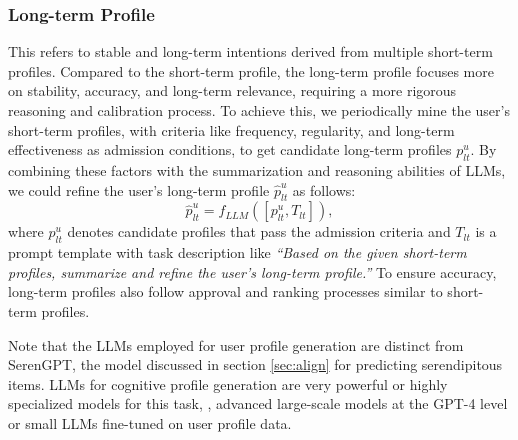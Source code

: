 
\subsubsection{Long-term Profile}\label{sec:long-term} This refers to stable and long-term intentions derived from multiple short-term profiles. Compared to the short-term profile, the long-term profile focuses more on stability, accuracy, and long-term relevance, requiring a more rigorous reasoning and calibration process. To achieve this, we periodically mine the user's short-term profiles, with criteria like frequency, regularity, and long-term effectiveness as admission conditions, to get candidate long-term profiles $p^u_{lt}$. By combining these factors with the summarization and reasoning abilities of LLMs, we could refine the user's long-term profile $\hat{p}^u_{lt}$ as follows:
\begin{equation}
    \hat{p}^u_{lt} = f_{LLM}([p^u_{lt}, T_{lt}]),
\label{eq:llm_long}
\end{equation}
where $p^u_{lt}$ denotes candidate profiles that pass the admission criteria and $T_{lt}$ is a prompt template with task description like \textit{``Based on the given short-term profiles, summarize and refine the user's long-term profile.''} To ensure accuracy, long-term profiles also follow approval and ranking processes similar to short-term profiles.

Note that the LLMs employed for user profile generation are distinct from SerenGPT, the model discussed in section \ref{sec:align} for predicting serendipitous items. LLMs for cognitive profile generation are very powerful or highly specialized models for this task, \eg, advanced large-scale models at the
GPT-4 level or small LLMs fine-tuned on user profile data.



